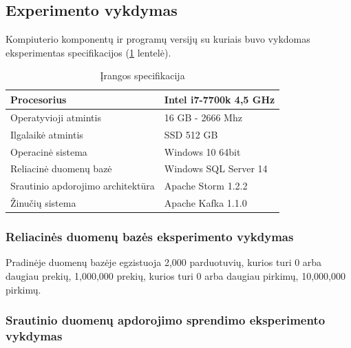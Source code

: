 \documentclass{VUMIFPSkursinis}
\begin{document}

\subsection{Experimento vykdymas}
Kompiuterio komponentų ir programų versijų su kuriais buvo vykdomas eksperimentas specifikacijos (\ref{table:hardware} lentelė).
    \begin{table}[!htbp]\begin{center}

        \caption{Įrangos specifikacija}
        \label{table:hardware}
        \begin{tabular}{ | l | l |  } 
            \hline
            Procesorius & Intel i7-7700k 4,5 GHz \\* \hline
            Operatyvioji atmintis & 16 GB - 2666 Mhz \\* \hline
            Ilgalaikė atmintis & SSD 512 GB \\* \hline
            Operacinė sistema & Windows 10 64bit \\* \hline
            Reliacinė duomenų bazė & Windows SQL Server 14 \\* \hline
            Srautinio apdorojimo architektūra & Apache Storm 1.2.2 \\* \hline
            Žinučių sistema & Apache Kafka 1.1.0 \\* \hline
        \end{tabular}
    \end{center}
\end{table}\par

\subsubsection{Reliacinės duomenų bazės eksperimento vykdymas}
Pradinėje duomenų bazėje egzistuoja 2,000 parduotuvių, kurios turi 0 arba daugiau prekių, 1,000,000 prekių, kurios turi 0 arba daugiau pirkimų, 10,000,000 pirkimų.

\subsubsection{Srautinio duomenų apdorojimo sprendimo eksperimento vykdymas}
\end{document}
